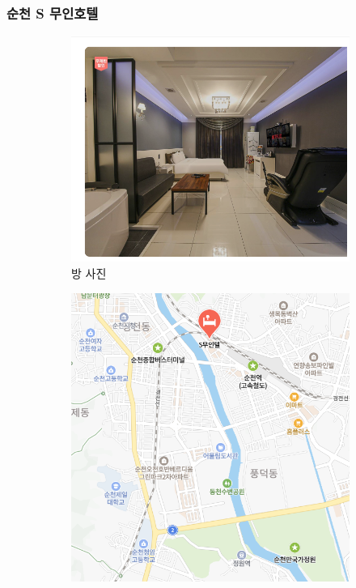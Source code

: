 \documentclass[10pt]{article}
\begin{document}
\subsubsection{순천 S 무인호텔}
\begin{figure}[htbp]
  \centering
  \begin{subfigure}{0.3\textwidth}
    \centering
    \includegraphics[width=\linewidth]{fig/순천S무인호텔_방.png}
    \caption{방 사진}
    \label{fig:1}
  \end{subfigure}
  \hfill
  \begin{subfigure}{0.3\textwidth}
    \centering
    \includegraphics[width=\linewidth]{fig/순천S무인호텔_위치.png}

\end{subfigure}
\end{figure}
\end{document}
